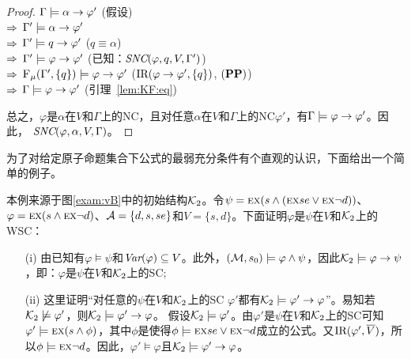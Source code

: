 \begin{proof}
	$\Gamma \models \alpha \rightarrow \varphi'$ \hfill  (假设)\\
	$\Rightarrow$ $\Gamma' \models \alpha \rightarrow \varphi'$ \\
	$\Rightarrow$ $\Gamma' \models q \rightarrow \varphi'$ \hfill  ($q \equiv \alpha$)\\
	$\Rightarrow$ $\Gamma' \models \varphi \rightarrow \varphi'$ \hfill (已知：$\emph{SNC}(\varphi,q,V,\Gamma')$)\\
	$\Rightarrow$ ${\textsc{F}_{\textsc{$\mu$}}}(\Gamma', \{q\}) \models \varphi \rightarrow \varphi'$ \hfill ($\textrm{IR}(\varphi \rightarrow \varphi', \{q\})$, $(\textbf{PP})$)\\
	$\Rightarrow$ $\Gamma \models \varphi \rightarrow \varphi'$ \hfill (引理~\ref{lem:KF:eq})
	
	总之，$\varphi$是$\alpha$在$V$和$\Gamma$上的NC，且对任意$\alpha$在$V$和$\Gamma$上的NC$\varphi'$，有$\Gamma \models \varphi \rightarrow \varphi'$。因此， $\emph{SNC}(\varphi,\alpha,V,\Gamma)$。
\end{proof}


为了对给定原子命题集合下公式的最弱充分条件有个直观的认识，下面给出一个简单的例子。

\begin{example}\label{examp:WSC}
	本例来源于图\ref{exam:vB}中的初始结构${\cal K}_2$。令$\psi = \textsc{e} \textsc{x}(s \wedge (\textsc{e} \textsc{x} se \vee \textsc{e} \textsc{x} \neg d))$、$\varphi = \textsc{e} \textsc{x}(s \wedge \textsc{e} \textsc{x} \neg d)$、${\cal A} =\{d, s, se\}$和$V = \{s, d\}$。下面证明$\varphi$是$\psi$在$V$和${\cal K}_2$上的WSC：
	\begin{itemize}
		\item[(i)] 由已知有$\varphi \models \psi$和$\textit{Var}(\varphi) \subseteq V$。此外，$({\cal M}, s_0) \models \varphi \wedge \psi$，因此${\cal K}_2 \models \varphi \rightarrow \psi$，即：$\varphi$是$\psi$在$V$和${\cal K}_2$上的SC;
		\item[(ii)] 这里证明“对任意的$\psi$在$V$和${\cal K}_2$上的SC $\varphi'$都有${\cal K}_2 \models \varphi' \rightarrow \varphi$”。易知若${\cal K}_2 \not \models \varphi'$，则${\cal K}_2\models \varphi' \rightarrow \varphi$。
		假设${\cal K}_2 \models \varphi'$。由$\varphi'$是$\psi$在$V$和${\cal K}_2$上的SC可知$\varphi' \models \textsc{e} \textsc{x}(s \wedge \phi)$，其中$\phi$是使得$\phi\models \textsc{e} \textsc{x} se \vee \textsc{e} \textsc{x} \neg d$成立的公式。又$\textrm{IR}(\varphi', \overline V)$，所以$\phi \models \textsc{e} \textsc{x} \neg d$。因此，$\varphi' \models \varphi$且${\cal K}_2 \models \varphi' \rightarrow \varphi$。
	\end{itemize}
\end{example}


